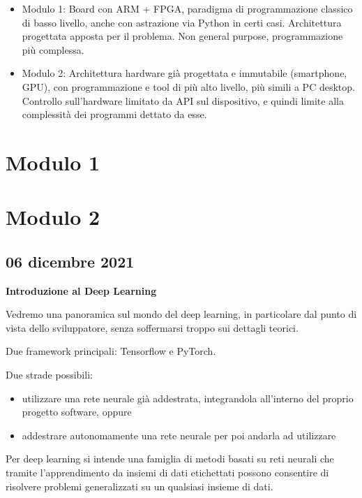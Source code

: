 \documentclass[a4paper,oneside]{book}
\begin{document}
    \begin{itemize}
        \item Modulo 1: Board con ARM + FPGA, paradigma di programmazione classico di basso livello,
            anche con astrazione via Python in certi casi. Architettura progettata apposta per 
            il problema. Non general purpose, programmazione più complessa.
        \item Modulo 2: Architettura hardware già progettata e immutabile (smartphone, GPU), con programmazione
            e tool di più alto livello, più simili a PC desktop. Controllo sull'hardware limitato 
            da API sul dispositivo, e quindi limite alla complessità dei programmi dettato da esse.
    \end{itemize}

    \chapter{Modulo 1}
    
    \chapter{Modulo 2}

    \section{06 dicembre 2021}

    \textbf{Introduzione al Deep Learning}

    Vedremo una panoramica sul mondo del deep learning,
    in particolare dal punto di vista dello sviluppatore,
    senza soffermarsi troppo sui dettagli teorici.

    Due framework principali: Tensorflow e PyTorch.

    Due strade possibili:
        \begin{itemize}
        \item utilizzare una rete neurale
        già addestrata, integrandola all'interno del proprio
        progetto software, oppure
        \item addestrare autonomamente una rete neurale per poi
        andarla ad utilizzare 
        \end{itemize}

    Per deep learning si intende una famiglia di metodi
    basati su reti neurali che tramite l'apprendimento da
    insiemi di dati etichettati possono consentire di risolvere
    problemi generalizzati su un qualsiasi insieme di dati.
    
\end{document}
